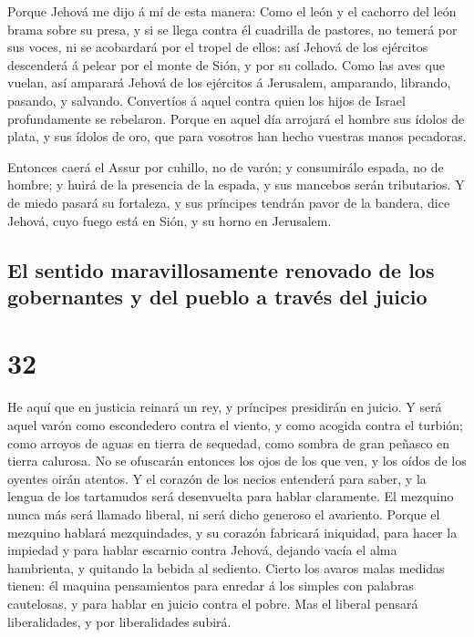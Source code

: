  Porque Jehová me dijo á mí de esta manera: Como el león y
el cachorro del león brama sobre su presa, y si se llega contra él
cuadrilla de pastores, no temerá por sus voces, ni se acobardará por el
tropel de ellos: así Jehová de los ejércitos descenderá á pelear por el
monte de Sión, y por su collado.  Como las aves que vuelan,
así amparará Jehová de los ejércitos á Jerusalem, amparando, librando,
pasando, y salvando.  Convertíos á aquel contra quien los
hijos de Israel profundamente se rebelaron.  Porque en aquel
día arrojará el hombre sus ídolos de plata, y sus ídolos de oro, que
para vosotros han hecho vuestras manos pecadoras.

 Entonces caerá el Assur por cuhillo, no de varón; y
consumirálo espada, no de hombre; y huirá de la presencia de la espada,
y sus mancebos serán tributarios.  Y de miedo pasará su
fortaleza, y sus príncipes tendrán pavor de la bandera, dice Jehová,
cuyo fuego está en Sión, y su horno en Jerusalem.

\hypertarget{el-sentido-maravillosamente-renovado-de-los-gobernantes-y-del-pueblo-a-travuxe9s-del-juicio}{%
\subsection{El sentido maravillosamente renovado de los gobernantes y
del pueblo a través del
juicio}\label{el-sentido-maravillosamente-renovado-de-los-gobernantes-y-del-pueblo-a-travuxe9s-del-juicio}}

\hypertarget{section-31}{%
\section{32}\label{section-31}}

 He aquí que en justicia reinará un rey, y príncipes
presidirán en juicio.  Y será aquel varón como escondedero
contra el viento, y como acogida contra el turbión; como arroyos de
aguas en tierra de sequedad, como sombra de gran peñasco en tierra
calurosa.  No se ofuscarán entonces los ojos de los que ven,
y los oídos de los oyentes oirán atentos.  Y el corazón de
los necios entenderá para saber, y la lengua de los tartamudos será
desenvuelta para hablar claramente.  El mezquino nunca más
será llamado liberal, ni será dicho generoso el avariento. 
Porque el mezquino hablará mezquindades, y su corazón fabricará
iniquidad, para hacer la impiedad y para hablar escarnio contra Jehová,
dejando vacía el alma hambrienta, y quitando la bebida al sediento.
 Cierto los avaros malas medidas tienen: él maquina
pensamientos para enredar á los simples con palabras cautelosas, y para
hablar en juicio contra el pobre.  Mas el liberal pensará
liberalidades, y por liberalidades subirá.

